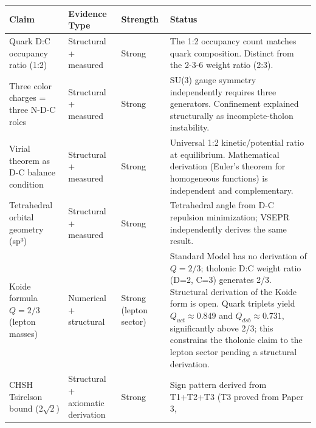 \documentclass[12pt]{article}
\begin{document}
\begin{longtable}[]{@{}
  >{\raggedright\arraybackslash}p{}
  >{\raggedright\arraybackslash}p{}
  >{\raggedright\arraybackslash}p{}
  >{\raggedright\arraybackslash}p{}@{}}
\toprule\noalign{}
\begin{minipage}[b]{\linewidth}\raggedright
Claim
\end{minipage} & \begin{minipage}[b]{\linewidth}\raggedright
Evidence Type
\end{minipage} & \begin{minipage}[b]{\linewidth}\raggedright
Strength
\end{minipage} & \begin{minipage}[b]{\linewidth}\raggedright
Status
\end{minipage} \\
\midrule\noalign{}
\endhead
\bottomrule\noalign{}
\endlastfoot
Quark D:C occupancy ratio (1:2) & Structural + measured & Strong & The
1:2 occupancy count matches quark composition. Distinct from the 2-3-6
weight ratio (2:3). \\
Three color charges = three N-D-C roles & Structural + measured & Strong
& SU(3) gauge symmetry independently requires three generators.
Confinement explained structurally as incomplete-tholon instability. \\
Virial theorem as D-C balance condition & Structural + measured & Strong
& Universal 1:2 kinetic/potential ratio at equilibrium. Mathematical
derivation (Euler's theorem for homogeneous functions) is independent
and complementary. \\
Tetrahedral orbital geometry (sp³) & Structural + measured & Strong &
Tetrahedral angle from D-C repulsion minimization; VSEPR independently
derives the same result. \\
Koide formula \(Q = 2/3\) (lepton masses) & Numerical + structural &
Strong (lepton sector) & Standard Model has no derivation of
\(Q = 2/3\); tholonic D:C weight ratio (D=2, C=3) generates 2/3.
Structural derivation of the Koide form is open. Quark triplets yield
\(Q_{uct} \approx 0.849\) and \(Q_{dsb} \approx 0.731\), significantly
above 2/3; this constrains the tholonic claim to the lepton sector
pending a structural derivation. \\
CHSH Tsirelson bound (\(2\sqrt{2}\)) & Structural + axiomatic derivation
& Strong & Sign pattern derived from T1+T2+T3 (T3 proved from Paper 3,

\end{longtable}
\end{document}
